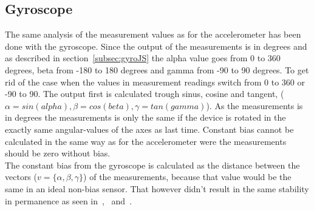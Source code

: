 \subsection{Gyroscope}
The same analysis of the measurement values as for the accelerometer has been done with the gyroscope. Since the output of the measurements is in degrees and as described in section~\ref{subsec:gyroJS} the alpha value goes from 0 to 360 degrees, beta from -180 to 180 degrees and gamma from -90 to 90 degrees. To get rid of the case when the values in measurement readings switch from 0 to 360 or -90 to 90. The output first is calculated trough sinus, cosine and tangent, ($\alpha=sin(alpha), \beta=cos(beta), \gamma=tan(gamma)$). As the measurements is in degrees the measurements is only the same if the device is rotated in the exactly same angular-values of the axes as last time. Constant bias cannot be calculated in the same way as for the accelerometer were the measurements should be zero without bias.\\
The constant bias from the gyroscope is calculated as the distance between the vectors ($v=\{\alpha, \beta,\gamma\}$) of the measurements, because that value would be the same in an ideal non-bias sensor.
That however didn't result in the same stability in permanence as seen in~,~ and~.

